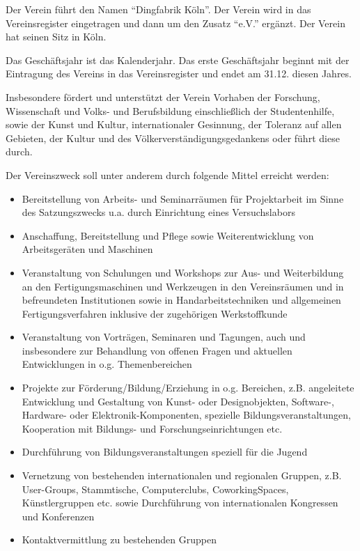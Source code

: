 \documentclass[12pt,ngerman]{scrartcl}
\begin{document}
\begin{contract}


Der Verein führt den Namen \enquote{Dingfabrik Köln}. Der Verein wird in das Vereinsregister eingetragen und dann um den Zusatz \enquote{e.V.} ergänzt. Der Verein hat seinen Sitz in Köln.

Das Geschäftsjahr ist das Kalenderjahr. Das erste Geschäftsjahr beginnt mit der Eintragung des Vereins in das Vereinsregister und endet am 31.12. diesen Jahres.



Insbesondere fördert und unterstützt der Verein Vorhaben der Forschung, Wissenschaft und Volks- und Berufsbildung einschließlich der Studentenhilfe, sowie der Kunst und Kultur, internationaler Gesinnung, der Toleranz auf allen Gebieten, der Kultur und des Völkerverständigungsgedankens oder führt diese durch.

Der Vereinszweck soll unter anderem durch folgende Mittel erreicht werden:

\begin{itemize}
\item Bereitstellung von Arbeits- und Seminarräumen für Projektarbeit im Sinne des Satzungszwecks u.a. durch Einrichtung eines Versuchslabors
\item Anschaffung, Bereitstellung und Pflege sowie Weiterentwicklung von Arbeitsgeräten und Maschinen
\item Veranstaltung von Schulungen und Workshops zur Aus- und Weiterbildung an den Fertigungsmaschinen und Werkzeugen in den Vereinsräumen und in befreundeten Institutionen sowie in Handarbeitstechniken und allgemeinen Fertigungsverfahren inklusive der zugehörigen Werkstoffkunde
\item Veranstaltung von Vorträgen, Seminaren und Tagungen, auch und insbesondere zur Behandlung von offenen Fragen und aktuellen Entwicklungen in o.g. Themenbereichen
\item Projekte zur Förderung/Bildung/Erziehung in o.g. Bereichen, z.B. angeleitete Entwicklung und Gestaltung von Kunst- oder Designobjekten, Software-, Hardware- oder Elektronik-Komponenten, spezielle Bildungsveranstaltungen, Kooperation mit Bildungs- und Forschungseinrichtungen etc.
\item Durchführung von Bildungsveranstaltungen speziell für die Jugend
\item Vernetzung von bestehenden internationalen und regionalen Gruppen, z.B. User-Groups, Stammtische, Computerclubs, CoworkingSpaces, Künstlergruppen etc. sowie Durchführung von internationalen Kongressen und Konferenzen
\item Kontaktvermittlung zu bestehenden Gruppen
\end{itemize}


\end{contract}
\end{document}
